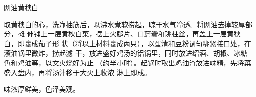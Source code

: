 %
%
%
%
%
%
%
\begin{recipe}{网油黄秧白}

\ingredients


\preparation

取黄秧白的心，洗净抽筋后，以沸水煮软捞起，晾干水气冷透。将网油去掉较厚部分，摊
伸铺上一层黄秧白菜，摆上火腿片、口蘑瓣和珧柱丝，再盖上一层黄秧白，即裹成茄子形
状（将以上材料裹成两只），以蛋清和豆粉调匀糊紧接口处，在滚油锅里微炸，捞起滤
干，放进盛好鸡汤的铝锅里，同时放进绍酒、胡椒、冰糖色和鸡油等，以文火烧好为止
（约半小时）。起锅时取出鸡油渣放进味精，先将菜盛入盘内，再将汤汁移于大火上收浓
淋上即成。

\features

味浓厚鲜美，色泽美观。

\end{recipe}

